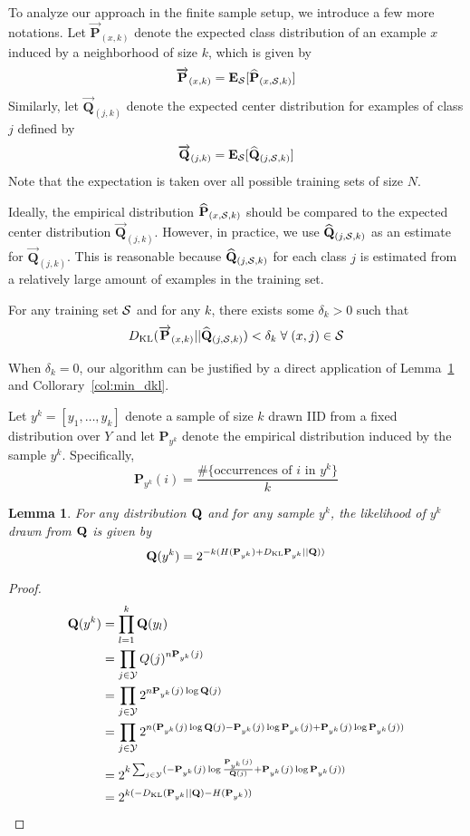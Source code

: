\documentclass{article}
\newtheorem{lemma}[theorem]{Lemma}
\begin{document}
\newcommand{\Pexpected}{\overrightarrow{\mathbf{P}}_{(x,k)}}
\newcommand{\Qexpected}{\overrightarrow{\mathbf{Q}}_{(j,k)}}

To analyze our approach in the finite sample setup, we introduce a few
more notations. Let $\Pexpected$ denote the expected class
distribution of an example $x$ induced by a neighborhood of size $k$,
which is given by
\[
\Pexpected = \mathbf{E}_{\trainset}[\Pemp]
\]
Similarly, let $\Qexpected$ denote the expected center distribution
for examples of class $j$ defined by
\[
\Qexpected =\mathbf{E}_{\trainset}[\Qemp]
\]
Note that the expectation is taken over all possible training sets of
size $N$.

Ideally, the empirical distribution $\widehat{\mathbf{P}}_{(x,\mathcal{S},k)}$ should be compared to the
expected center distribution $\Qexpected$. However, in practice, we
use $\widehat{\mathbf{Q}}_{(j,\mathcal{S},k)}$ as an estimate for $\Qexpected$. This is reasonable
because $\widehat{\mathbf{Q}}_{(j,\mathcal{S},k)}$ for each class $j$ is estimated from a relatively
large amount of examples in the training set.

For any training set $\mathcal{S}$ and for any $k$, there exists some
$\delta_k > 0$ such that
\[
\dkl(\Pexpected || \Qemp) < \delta_k \; \forall \; (x,j) \in \trainset
\]

When $\delta_k = 0$, our algorithm can be justified by a direct
application of Lemma~\ref{lemma:dkl} and Collorary~\ref{col:min_dkl}.

\newcommand{\sampleYK}{y^k}
\newcommand{\sampleEmpDist}{\mathbf{P}_{y^k}}

Let $\sampleYK = [y_1, \ldots, y_k]$ denote a sample of size $k$ drawn IID
from a fixed distribution over $Y$ and let $\sampleEmpDist$ denote the
empirical distribution induced by the sample
$\sampleYK$. Specifically,
\[
\sampleEmpDist(i) = \frac{\#\{ \mbox{occurrences of } i \mbox{ in } y^k\}}{k}
\]

\begin{lemma}
\label{lemma:dkl}
For any distribution $\mathbf{Q}$ and for any sample $\sampleYK$, the
likelihood of $\sampleYK$ drawn from $\mathbf{Q}$ is given by
\[
\Q(y^k) = 2^{-k(H(\sampleEmpDist) + \dkl\sampleEmpDist || \Q))}
\]
\end{lemma}
\begin{proof}
  \begin{align*}
    \Q(y^k) 
&= \prod_{l=1}^k \Q(y_l)\\ 
&= \prod_{j \in \Y} Q(j)^{n\sampleEmpDist(j)}\\ 
&= \prod_{j \in \Y} 2^{n\sampleEmpDist(j) \log \Q(j)}\\ 
&= \prod_{j \in \Y} 2^{n(\sampleEmpDist(j) \log \Q(j) - \sampleEmpDist(j) \log \sampleEmpDist(j) + \sampleEmpDist(j) \log \sampleEmpDist(j))}\\ 
&= 2^{k \sum_{j \in \Y} (-\sampleEmpDist(j) \log \frac{\sampleEmpDist(j)}{\Q(j)} + \sampleEmpDist(j) \log \sampleEmpDist(j))}\\ 
&= 2^{k(-\dkl(\sampleEmpDist||\Q) - H(\sampleEmpDist))}\\
  \end{align*}
\end{proof}
\end{document}
